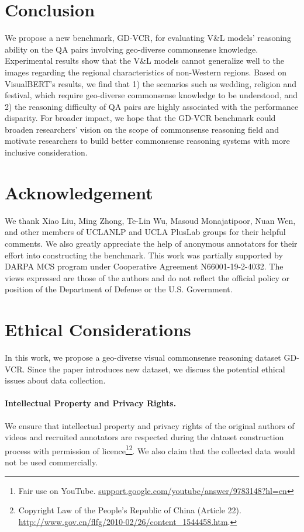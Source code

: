 \documentclass[11pt]{article}
\begin{document}
\section{Conclusion}
We propose a new benchmark, GD-VCR, for evaluating V\&L models' reasoning ability on the QA pairs involving geo-diverse commonsense knowledge. Experimental results show that the V\&L models cannot generalize well to the images regarding the regional characteristics of non-Western regions. Based on VisualBERT's results, we find that 1) the scenarios such as wedding, religion and festival, which require geo-diverse commonsense knowledge to be understood, and 2) the reasoning difficulty of QA pairs are highly associated with the performance disparity. For broader impact, we hope that the GD-VCR benchmark could broaden researchers' vision on the scope of commonsense reasoning field and motivate researchers to build better commonsense reasoning systems with more inclusive consideration.

\section*{Acknowledgement}
We thank Xiao Liu, Ming Zhong, Te-Lin Wu, Masoud Monajatipoor, Nuan Wen, and other members of UCLANLP and UCLA PlusLab groups for their helpful comments. We also greatly appreciate the help of anonymous annotators for their effort into constructing the benchmark. This work was partially supported by DARPA MCS program under Cooperative Agreement N66001-19-2-4032. The views expressed are those of the authors and do not reflect the official policy or position of the Department of Defense or the U.S. Government.

\section*{Ethical Considerations}
\label{ethics}
In this work, we propose a geo-diverse visual commonsense reasoning dataset GD-VCR. Since the paper introduces new dataset, we discuss the potential ethical issues about data collection.

\paragraph{Intellectual Property and Privacy Rights.}
We ensure that intellectual property and privacy rights of the original authors of videos and recruited annotators are respected during the dataset construction process with permission of licence\footnote{Fair use on YouTube. \url{support.google.com/youtube/answer/9783148?hl=en}}\footnote{Copyright Law of the People's Republic of China (Article 22). \url{http://www.gov.cn/flfg/2010-02/26/content_1544458.htm}.}. We also claim that the collected data would not be used commercially.
\end{document}
